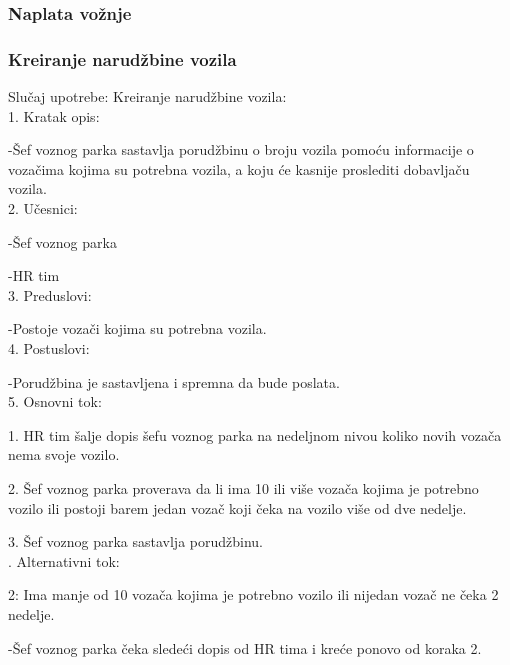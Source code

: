 \subsubsection{\bfseries Naplata vo\v znje}

\newpage

\subsubsection{\bfseries Kreiranje narudžbine vozila}
\noindent Slučaj upotrebe: Kreiranje narudžbine vozila:\\
1. Kratak opis:
\par -Šef voznog parka sastavlja porudžbinu o broju vozila pomoću informacije o vozačima kojima su potrebna vozila, a koju će kasnije proslediti dobavljaču vozila.\\
2. Učesnici:
\par -Šef voznog parka
\par -HR tim\\
3. Preduslovi:
\par -Postoje vozači kojima su potrebna vozila.\\
4. Postuslovi:
\par -Porudžbina je sastavljena i spremna da bude poslata.\\
5. Osnovni tok:
\par 1. HR tim šalje dopis šefu voznog parka na nedeljnom nivou koliko novih vozača nema svoje vozilo.
\par 2. Šef voznog parka proverava da li ima 10 ili više vozača kojima je potrebno vozilo ili postoji barem jedan vozač koji čeka na vozilo više od dve nedelje.
\par 3. Šef voznog parka sastavlja porudžbinu.\\

. Alternativni tok:
\par 2: Ima manje od 10 vozača kojima je potrebno vozilo ili nijedan vozač ne čeka 2 nedelje.
\par -Šef voznog parka čeka sledeći dopis od HR tima i kreće ponovo od koraka 2.

